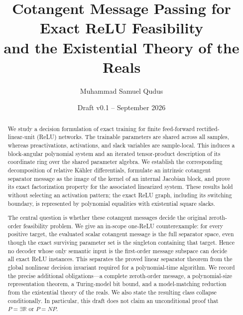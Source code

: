 \documentclass[11pt]{article}
\title{Cotangent Message Passing for Exact ReLU Feasibility\\
and the Existential Theory of the Reals}
\author{Muhammad Samuel Qudus}
\date{Draft v0.1 -- September 2026}
\begin{document}
\maketitle

\begin{abstract}
We study a decision formulation of exact training for finite feed-forward
rectified-linear-unit (ReLU) networks.  The trainable parameters are shared
across all samples, whereas preactivations, activations, and slack variables
are sample-local.  This induces a block-angular polynomial system and an
iterated tensor-product description of its coordinate ring over the shared
parameter algebra.  We establish the corresponding decomposition of relative
K\"ahler differentials, formulate an intrinsic cotangent separator message as
the image of the kernel of an internal Jacobian block, and prove its exact
factorization property for the associated linearized system.  These results
hold without selecting an activation pattern; the exact ReLU graph, including
its switching boundary, is represented by polynomial equalities with
existential square slacks.

The central question is whether these cotangent messages decide the original
zeroth-order feasibility problem.  We give an in-scope one-ReLU counterexample:
for every positive target, the evaluated scalar cotangent message is the full
separator space, even though the exact surviving parameter set is the
singleton containing that target.  Hence no decoder whose only semantic input
is the first-order message subspace can decide all exact ReLU instances.  This
separates the proved linear separator theorem from the global nonlinear
decision invariant required for a polynomial-time algorithm.  We record the
precise additional obligations---a complete zeroth-order message, a
polynomial-size representation theorem, a Turing-model bit bound, and a
model-matching reduction from the existential theory of the reals.  We also
state the resulting class collapse conditionally.  In particular, this draft
does not claim an unconditional proof that
\(P=\exists\mathbb{R}\) or \(P=NP\).
\end{abstract}

\tableofcontents




















\appendix











\end{document}

